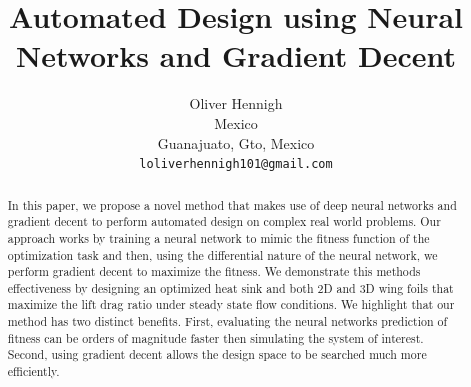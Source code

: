 \documentclass{article} %
\title{Automated Design using Neural Networks and Gradient Decent}
\author{Oliver Hennigh \\
Mexico\\
Guanajuato, Gto, Mexico \\
\texttt{loliverhennigh101@gmail.com} \\
}
\begin{document}
\maketitle

\begin{abstract}
In this paper, we propose a novel method that makes use of deep neural networks and gradient decent to perform automated design on complex real world problems. Our approach works by training a neural network to mimic the fitness function of the optimization task and then, using the differential nature of the neural network, we perform gradient decent to maximize the fitness. We demonstrate this methods effectiveness by designing an optimized heat sink and both 2D and 3D wing foils that maximize the lift drag ratio under steady state flow conditions. We highlight that our method has two distinct benefits. First, evaluating the neural networks prediction of fitness can be orders of magnitude faster then simulating the system of interest. Second, using gradient decent allows the design space to be searched much more efficiently.


\end{abstract}
\end{document}
